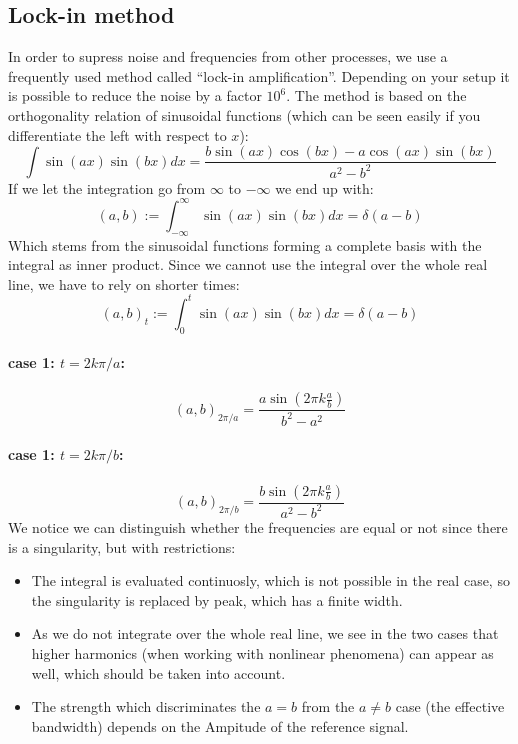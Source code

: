 \subsection{Lock-in method}
In order to supress noise and frequencies from other processes, we use
a frequently used method called ``lock-in amplification''. Depending on your
setup it is possible to reduce the noise by a factor $10^6$. The method
is based on the orthogonality relation of sinusoidal functions (which
can be seen easily if you differentiate the left with respect to $x$):
\begin{equation}
    \int \sin(a x) \sin(b x) dx =\frac{ b \sin(a x) \cos(b x)-a \cos(a x)
            \sin(b x)}{a^2-b^2}
\end{equation}
If we let the integration go from $\infty$ to $-\infty$ we end up with:
\begin{equation}
    (a,b) := \int_{-\infty}^{\infty} \sin(a x) \sin(b x) dx = \delta(a - b)
\end{equation}
Which stems from the sinusoidal functions forming a complete basis with
the integral as inner product.
Since we cannot use the integral over the whole real line, we have to rely
on shorter times: 
\begin{equation}
    (a,b)_t := \int_{0}^{t} \sin(a x) \sin(b x) dx = \delta(a - b)
\end{equation}
\paragraph{case 1: $t = 2k\pi /a$:}
\begin{equation}
    (a,b)_{2\pi /a} = \frac{a \sin(2\pi k\frac{a}{b})}{b^2 - a^2}
\end{equation}
\paragraph{case 1: $t = 2k\pi /b$:}
\begin{equation}
    (a,b)_{2\pi /b} = \frac{b \sin(2\pi k\frac{a}{b})}{a^2 - b^2}
\end{equation}
We notice we can distinguish whether the frequencies are equal or not 
since there is a singularity, but with restrictions:
\begin{itemize}
    \item The integral is evaluated continuosly, which is not possible
        in the real case, so the singularity is replaced by peak, which
        has a finite width.
\item As we do not integrate over the whole real line, we see in the two
    cases that higher harmonics (when working with nonlinear phenomena)
    can appear as well, which should be taken into account.
\item The strength which discriminates the $a=b$ from the $a\neq b$ case
    (the effective bandwidth)
    depends on the Ampitude of the reference signal. 
\end{itemize}

